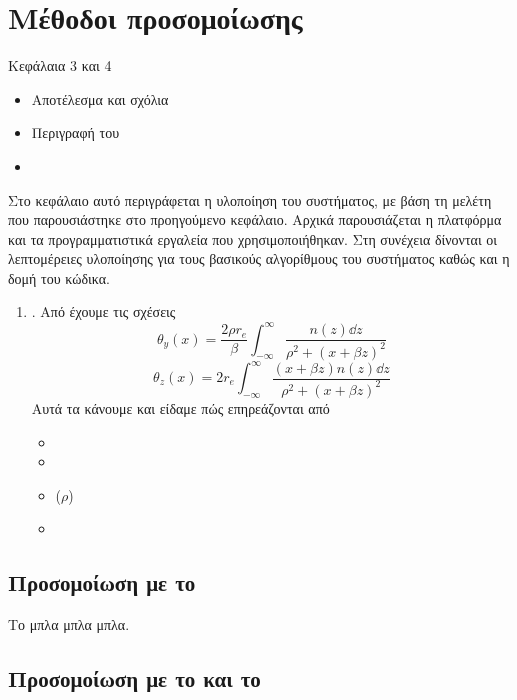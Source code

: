 \chapter{Μέθοδοι προσομοίωσης}
Κεφάλαια 3 και 4
\begin{itemize}
\item Αποτέλεσμα και σχόλια
\item Περιγραφή του 
\item {}
\end{itemize}
Στο κεφάλαιο αυτό περιγράφεται η υλοποίηση του συστήματος, με βάση
τη μελέτη που παρουσιάστηκε στο προηγούμενο κεφάλαιο. Αρχικά
παρουσιάζεται η πλατφόρμα και τα προγραμματιστικά εργαλεία που
χρησιμοποιήθηκαν. Στη συνέχεια δίνονται οι λεπτομέρειες υλοποίησης
για τους βασικούς αλγορίθμους του συστήματος καθώς και η δομή του
κώδικα.

\begin{enumerate}
	\item {}. Από \cite{Logatchov1999} έχουμε τις σχέσεις 
		\begin{equation}
			\theta_y (x) = \frac{2 \rho r_e}{\beta} \int_{-\infty}^{\infty}\frac{n(z) \dd z}{\rho^2 + \left(x+\beta z \right) ^2}
		\end{equation}
		\begin{equation}
			\theta_z(x) = 2 r_e \int_{-\infty}^{\infty}\frac{(x+\beta z)n(z) \dd z}{\rho^2 + \left(x+\beta z \right) ^2}
		\end{equation}
		Αυτά τα κάνουμε  και είδαμε πώς επηρεάζονται από 
		\begin{itemize}
			\item {}
			\item {}
			\item {} ($\rho$) 
			\item {} 
		\end{itemize}   
\end{enumerate}

\section{Προσομοίωση με το }
Το  μπλα μπλα μπλα.

\section{Προσομοίωση με το  και το }


